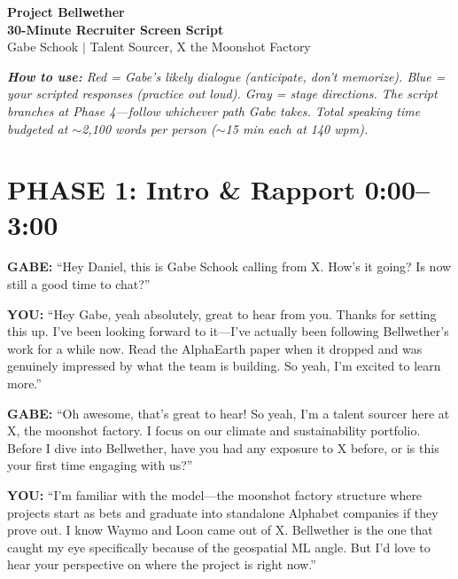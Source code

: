 \documentclass[11pt,letterpaper]{article}
\newenvironment{gabe}{\begin{mdframed}[backgroundcolor=gabebg,linewidth=0pt,innertopmargin=8pt,innerbottommargin=8pt]\textbf{\color{xred}GABE:} }{\end{mdframed}}
\newenvironment{you}{\begin{mdframed}[backgroundcolor=youbg,linewidth=0pt,innertopmargin=8pt,innerbottommargin=8pt]\textbf{\color{xblue}YOU:} }{\end{mdframed}}
\begin{document}
\begin{center}
    {\Huge \textbf{Project Bellwether}} \\[0.3em]
    {\LARGE \textbf{30-Minute Recruiter Screen Script}} \\[0.3em]
    {\large Gabe Schook $\vert$ Talent Sourcer, X the Moonshot Factory}
\end{center}

\vspace{0.3em}
\noindent\textit{\textbf{How to use:} {\color{xred}Red} = Gabe's likely dialogue (anticipate, don't memorize). {\color{xblue}Blue} = your scripted responses (practice out loud). Gray = stage directions. The script branches at Phase 4---follow whichever path Gabe takes. Total speaking time budgeted at $\sim$2,100 words per person ($\sim$15 min each at 140 wpm).}

\section*{PHASE 1: Intro \& Rapport \hfill {\color{xgray}\normalsize 0:00--3:00}}

\begin{gabe}
``Hey Daniel, this is Gabe Schook calling from X. How's it going? Is now still a good time to chat?''
\end{gabe}

\begin{you}
``Hey Gabe, yeah absolutely, great to hear from you. Thanks for setting this up. I've been looking forward to it---I've actually been following Bellwether's work for a while now. Read the AlphaEarth paper when it dropped and was genuinely impressed by what the team is building. So yeah, I'm excited to learn more.''
\end{you}

\begin{gabe}
``Oh awesome, that's great to hear! So yeah, I'm a talent sourcer here at X, the moonshot factory. I focus on our climate and sustainability portfolio. Before I dive into Bellwether, have you had any exposure to X before, or is this your first time engaging with us?''
\end{gabe}

\begin{you}
``I'm familiar with the model---the moonshot factory structure where projects start as bets and graduate into standalone Alphabet companies if they prove out. I know Waymo and Loon came out of X. Bellwether is the one that caught my eye specifically because of the geospatial ML angle. But I'd love to hear your perspective on where the project is right now.''
\end{you}
\end{document}
